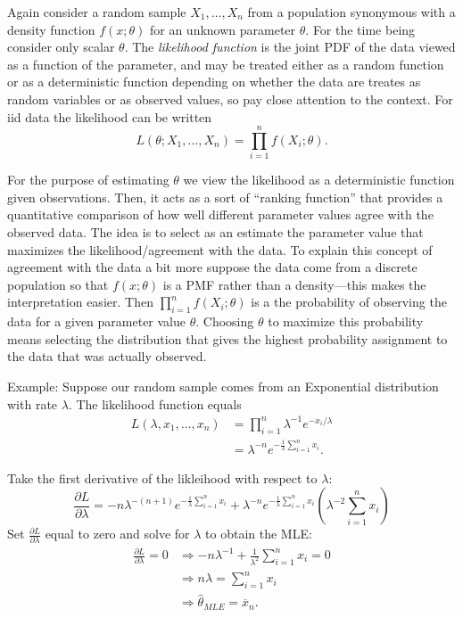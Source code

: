 \documentclass[
]{book}
\begin{document}
Again consider a random sample \(X_1, \ldots, X_n\) from a population synonymous with a density function \(f(x;\theta)\) for an unknown parameter \(\theta\). For the time being consider only scalar \(\theta\). The \emph{likelihood function} is the joint PDF of the data viewed as a function of the parameter, and may be treated either as a random function or as a deterministic function depending on whether the data are treates as random variables or as observed values, so pay close attention to the context. For iid data the likelihood can be written
\[L(\theta;X_1, \ldots, X_n) = \prod_{i=1}^n f(X_i;\theta).\]

For the purpose of estimating \(\theta\) we view the likelihood as a deterministic function given observations. Then, it acts as a sort of ``ranking function'' that provides a quantitative comparison of how well different parameter values agree with the observed data. The idea is to select as an estimate the parameter value that maximizes the likelihood/agreement with the data. To explain this concept of agreement with the data a bit more suppose the data come from a discrete population so that \(f(x;\theta)\) is a PMF rather than a density---this makes the interpretation easier. Then \(\prod_{i=1}^n f(X_i;\theta)\) is a the probability of observing the data for a given parameter value \(\theta\). Choosing \(\theta\) to maximize this probability means selecting the distribution that gives the highest probability assignment to the data that was actually observed.

Example: Suppose our random sample comes from an Exponential distribution with rate \(\lambda\). The likelihood function equals
\begin{align*}
L(\lambda, x_1, \ldots, x_n) &= \prod_{i=1}^n \lambda^{-1}e^{-x_i/\lambda}\\
& = \lambda ^{-n}e^{-\tfrac1\lambda\sum_{i=1}^n x_i}.
\end{align*}

Take the first derivative of the likleihood with respect to \(\lambda\):
\[\frac{\partial L}{\partial \lambda} = -n\lambda^{-(n+1)}e^{-\tfrac1\lambda \sum_{i=1}^n x_i} + \lambda^{-n}e^{-\tfrac1\lambda\sum_{i=1}^n x_i}\left(\lambda^{-2}\sum_{i=1}^n x_i\right)\]
Set \(\tfrac{\partial L}{\partial \lambda}\) equal to zero and solve for \(\lambda\) to obtain the MLE:
\begin{align*}
\frac{\partial L}{\partial \lambda} = 0 & \Rightarrow -n\lambda^{-1} + \tfrac{1}{\lambda^2}\sum_{i=1}^n x_i = 0\\
& \Rightarrow n\lambda = \sum_{i=1}^n x_i\\
& \Rightarrow \hat{\theta}_{MLE} = \overline x_n.
\end{align*}
\end{document}
